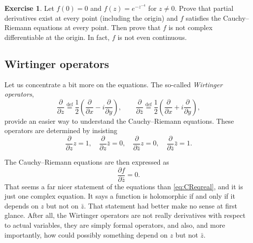\documentclass[12pt,openany]{book}
\newcommand{\myindex}[1]{#1\index{#1}}
\theoremstyle{plain}
\theoremstyle{remark}
\theoremstyle{definition}
\newenvironment{exbox}{%
    \def\FrameCommand{\vrule width 1pt \relax\hspace {10pt}}%
    \MakeFramed {\advance \hsize -\width \FrameRestore }%
}{%
    \endMakeFramed
}
\theoremstyle{exercise}
\newtheorem{exercise}{Exercise}[section]
\theoremstyle{example}
\begin{document}
\begin{exbox}
\begin{exercise}
Let $f(0) = 0$ and $f(z) = e^{-z^{-4}}$ for $z \not=0$.  Prove that partial
derivatives exist at every point (including the origin) and $f$
satisfies the Cauchy--Riemann equations at every point.
Then prove
that $f$ is not complex differentiable at the origin.  In fact, $f$ is not
even continuous.
\end{exercise}
\end{exbox}


\subsection{Wirtinger operators}

Let us concentrate a bit more on the equations.
The so-called \emph{\myindex{Wirtinger operators}},
\begin{equation*}
\frac{\partial}{\partial z}
\overset{\text{def}}{=}
\frac{1}{2}
\left(
\frac{\partial}{\partial x} - i
\frac{\partial}{\partial y}
\right),
\qquad
\frac{\partial}{\partial \bar{z}}
\overset{\text{def}}{=}
\frac{1}{2}
\left(
\frac{\partial}{\partial x} + i
\frac{\partial}{\partial y}
\right)
,
\end{equation*}
provide an easier way to understand the
Cauchy--Riemann equations.
These operators are determined by insisting
%
\begin{equation*}
\frac{\partial}{\partial z} z = 1, \quad
\frac{\partial}{\partial z} \bar{z} = 0, \quad
\frac{\partial}{\partial \bar{z}} z = 0, \quad
\frac{\partial}{\partial \bar{z}} \bar{z} = 1.
\end{equation*}

The Cauchy--Riemann equations are then expressed as
\begin{equation} \label{eq:CReq}
\frac{\partial f}{\partial \bar{z}} = 0 .
\end{equation}
That seems a far nicer statement of the equations than \eqref{eq:CReqreal},
and it is just one complex equation.  
It says
a function is holomorphic if and only if it depends on $z$ but not on
$\bar{z}$.  That statement had better make no sense at first glance.
After all, the Wirtinger operators are not really derivatives with
respect to actual variables,
they are simply formal operators, and also, and more importantly,
how could possibly something depend on $z$ but not $\bar{z}$.
\end{document}
